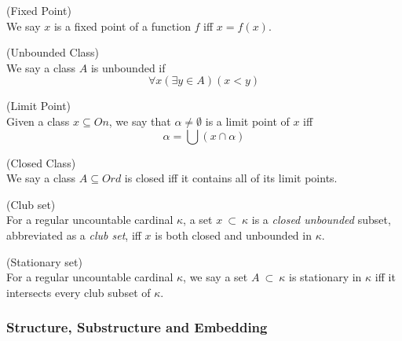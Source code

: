 \begin{definition}{(Fixed Point)}\label{def:fixed_point}\\
We say $x$ is a fixed point of a function $f$ iff $x=f(x)$.
\end{definition}

\begin{definition}{(Unbounded Class)}\label{def:unbounded_class}\\
We say a class $A$ is unbounded if 
\begin{equation}
\forall x (\exists y \in A) (x < y)
\end{equation}
\end{definition}

\begin{definition}{(Limit Point)}\label{def:limit_point}\\
Given a class $x \subseteq On$, we say that $\alpha \neq \emptyset$ is a limit point of $x$ iff 
\begin{equation}
\alpha = \bigcup(x \cap \alpha)
\end{equation}
\end{definition}

\begin{definition}{(Closed Class)}\label{def:closed_class}\\
We say a class $A \subseteq Ord$ is closed iff it contains all of its limit points.
\end{definition}

\begin{definition}{(Club set)}\label{def:club_set}\\
For a regular uncountable cardinal $\kappa$, a set $x\ \subset\ \kappa$ is a \emph{closed unbounded} subset, abbreviated as a \emph{club set}, iff $x$ is both closed and unbounded in $\kappa$.
\end{definition}

\begin{definition}{(Stationary set)}\label{def:stationary_set}\\
For a regular uncountable cardinal $\kappa$, we say a set $A\ \subset\ \kappa$ is stationary in $\kappa$ iff it intersects every club subset of $\kappa$.
\end{definition}

\subsubsection{Structure, Substructure and Embedding}

